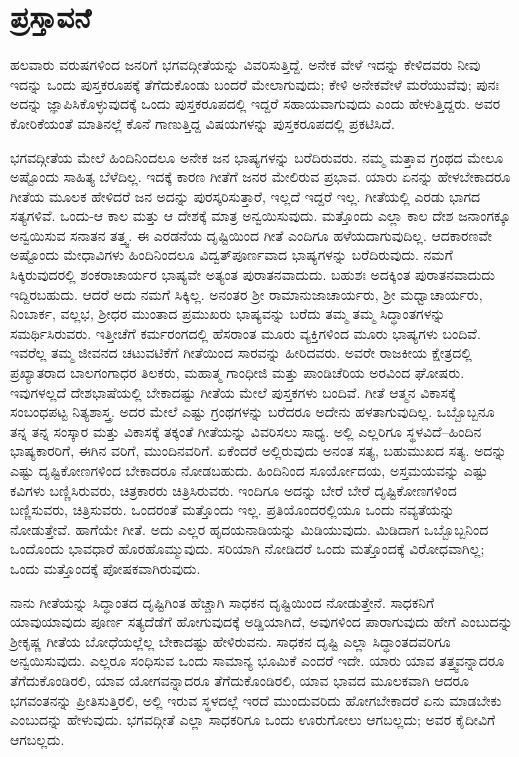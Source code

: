 
\chapter*{ಪ್ರಸ್ತಾವನೆ}

ಹಲವಾರು ವರುಷಗಳಿಂದ ಜನರಿಗೆ ಭಗವದ್ಗೀತೆಯನ್ನು ವಿವರಿಸುತ್ತಿದ್ದೆ. ಅನೇಕ ವೇಳೆ ಇದನ್ನು ಕೇಳಿದವರು ನೀವು ಇದನ್ನು ಒಂದು ಪುಸ್ತಕರೂಪಕ್ಕೆ ತೆಗೆದುಕೊಂಡು ಬಂದರೆ ಮೇಲಾಗುವುದು; ಕೇಳಿ ಅನೇಕವೇಳೆ ಮರೆಯುವೆವು; ಪುನಃ ಅದನ್ನು ಜ್ಞಾಪಿಸಿಕೊಳ್ಳುವುದಕ್ಕೆ ಒಂದು ಪುಸ್ತಕರೂಪದಲ್ಲಿ ಇದ್ದರೆ ಸಹಾಯವಾಗುವುದು ಎಂದು ಹೇಳುತ್ತಿದ್ದರು. ಅವರ ಕೋರಿಕೆಯಂತೆ ಮಾತಿನಲ್ಲೆ ಕೊನೆ ಗಾಣುತ್ತಿದ್ದ ವಿಷಯಗಳನ್ನು ಪುಸ್ತಕರೂಪದಲ್ಲಿ ಪ್ರಕಟಿಸಿದೆ.

ಭಗವದ್ಗೀತೆಯ ಮೇಲೆ ಹಿಂದಿನಿಂದಲೂ ಅನೇಕ ಜನ ಭಾಷ್ಯಗಳನ್ನು ಬರೆದಿರುವರು. ನಮ್ಮ ಮತ್ತಾವ ಗ್ರಂಥದ ಮೇಲೂ ಅಷ್ಟೊಂದು ಸಾಹಿತ್ಯ ಬೆಳೆದಿಲ್ಲ. ಇದಕ್ಕೆ ಕಾರಣ ಗೀತೆಗೆ ಜನರ ಮೇಲಿರುವ ಪ್ರಭಾವ. ಯಾರು ಏನನ್ನು ಹೇಳಬೇಕಾದರೂ ಗೀತೆಯ ಮೂಲಕ ಹೇಳಿದರೆ ಜನ ಅದನ್ನು ಪುರಸ್ಕರಿಸುತ್ತಾರೆ, ಇಲ್ಲದೆ ಇದ್ದರೆ ಇಲ್ಲ. ಗೀತೆಯಲ್ಲಿ ಎರಡು ಭಾಗದ ಸತ್ಯಗಳಿವೆ. ಒಂದು-ಆ ಕಾಲ ಮತ್ತು ಆ ದೇಶಕ್ಕೆ ಮಾತ್ರ ಅನ್ವಯಿಸುವುದು. ಮತ್ತೊಂದು ಎಲ್ಲಾ ಕಾಲ ದೇಶ ಜನಾಂಗಕ್ಕೂ ಅನ್ವಯಿಸುವ ಸನಾತನ ತತ್ತ್ವ. ಈ ಎರಡನೆಯ ದೃಷ್ಟಿಯಿಂದ ಗೀತೆ ಎಂದಿಗೂ ಹಳೆಯದಾಗುವುದಿಲ್ಲ. ಆದಕಾರಣವೇ ಅಷ್ಟೊಂದು ಮೇಧಾವಿಗಳು ಹಿಂದಿನಿಂದಲೂ ವಿದ್ವತ್​ಪೂರ್ಣವಾದ ಭಾಷ್ಯಗಳನ್ನು ಬರೆದಿರುವುದು. ನಮಗೆ ಸಿಕ್ಕಿರುವುದರಲ್ಲಿ ಶಂಕರಾಚಾರ್ಯರ ಭಾಷ್ಯವೇ ಅತ್ಯಂತ ಪುರಾತನವಾದುದು. ಬಹುಶಃ ಅದಕ್ಕಿಂತ ಪುರಾತನವಾದುದು ಇದ್ದಿರಬಹುದು. ಆದರೆ ಅದು ನಮಗೆ ಸಿಕ್ಕಿಲ್ಲ. ಅನಂತರ ಶ್ರೀ ರಾಮಾನುಜಾಚಾರ್ಯರು, ಶ್ರೀ ಮಧ್ವಾಚಾರ್ಯರು, ನಿಂಬಾರ್ಕ, ವಲ್ಲಭ, ಶ್ರೀಧರ ಮುಂತಾದ ಪ್ರಮುಖರು ಭಾಷ್ಯವನ್ನು ಬರೆದು ತಮ್ಮ ತಮ್ಮ ಸಿದ್ಧಾಂತಗಳನ್ನು ಸಮರ್ಥಿಸಿರುವರು. ಇತ್ತೀಚೆಗೆ ಕರ್ಮರಂಗದಲ್ಲಿ ಹೆಸರಾಂತ ಮೂರು ವ್ಯಕ್ತಿಗಳಿಂದ ಮೂರು ಭಾಷ್ಯಗಳು ಬಂದಿವೆ. ಇವರೆಲ್ಲ ತಮ್ಮ ಜೀವನದ ಚಟುವಟಿಕೆಗೆ ಗೀತೆಯಿಂದ ಸಾರವನ್ನು ಹೀರಿದವರು. ಅವರೇ ರಾಜಕೀಯ ಕ್ಷೇತ್ರದಲ್ಲಿ ಪ್ರಖ್ಯಾತರಾದ ಬಾಲಗಂಗಾಧರ ತಿಲಕರು, ಮಹಾತ್ಮ ಗಾಂಧೀಜಿ ಮತ್ತು ಪಾಂಡಿಚೆರಿಯ ಅರವಿಂದ ಘೋಷರು. ಇವುಗಳಲ್ಲದೆ ದೇಶಭಾಷೆಯಲ್ಲಿ ಬೇಕಾದಷ್ಟು ಗೀತೆಯ ಮೇಲೆ ಪುಸ್ತಕಗಳು ಬಂದಿವೆ. ಗೀತೆ ಆತ್ಮನ ವಿಕಾಸಕ್ಕೆ ಸಂಬಂಧಪಟ್ಟ ನಿತ್ಯಶಾಸ್ತ್ರ. ಅದರ ಮೇಲೆ ಎಷ್ಟು ಗ್ರಂಥಗಳನ್ನು ಬರೆದರೂ ಅದೇನು ಹಳತಾಗುವುದಿಲ್ಲ. ಒಬ್ಬೊಬ್ಬನೂ ತನ್ನ ತನ್ನ ಸಂಸ್ಕಾರ ಮತ್ತು ವಿಕಾಸಕ್ಕೆ ತಕ್ಕಂತೆ ಗೀತೆಯನ್ನು ವಿವರಿಸಲು ಸಾಧ್ಯ. ಅಲ್ಲಿ ಎಲ್ಲರಿಗೂ ಸ್ಥಳವಿದೆ–ಹಿಂದಿನ ಭಾಷ್ಯಕಾರರಿಗೆ, ಈಗಿನ ವರಿಗೆ, ಮುಂದಿನವರಿಗೆ. ಏಕೆಂದರೆ ಅಲ್ಲಿರುವುದು ಅನಂತ ಸತ್ಯ, ಬಹುಮುಖದ ಸತ್ಯ. ಅದನ್ನು ಎಷ್ಟು ದೃಷ್ಟಿಕೋಣಗಳಿಂದ ಬೇಕಾದರೂ ನೋಡಬಹುದು. ಹಿಂದಿನಿಂದ ಸೂರ್ಯೋದಯ, ಅಸ್ತಮಯವನ್ನು ಎಷ್ಟು ಕವಿಗಳು ಬಣ್ಣಿಸಿರುವರು, ಚಿತ್ರಕಾರರು ಚಿತ್ರಿಸಿರುವರು. ಇಂದಿಗೂ ಅದನ್ನು ಬೇರೆ ಬೇರೆ ದೃಷ್ಟಿಕೋಣಗಳಿಂದ ಬಣ್ಣಿಸುವರು, ಚಿತ್ರಿಸುವರು. ಒಂದರಂತೆ ಮತ್ತೊಂದು ಇಲ್ಲ. ಪ್ರತಿಯೊಂದರಲ್ಲಿಯೂ ಒಂದು ನವ್ಯತೆಯನ್ನು ನೋಡುತ್ತೇವೆ. ಹಾಗೆಯೇ ಗೀತೆ. ಅದು ಎಲ್ಲರ ಹೃದಯನಾಡಿಯನ್ನು ಮಿಡಿಯುವುದು. ಮಿಡಿದಾಗ ಒಬ್ಬೊಬ್ಬನಿಂದ ಒಂದೊಂದು ಭಾವಧಾರೆ ಹೊರಹೊಮ್ಮುವುದು. ಸರಿಯಾಗಿ ನೋಡಿದರೆ ಒಂದು ಮತ್ತೊಂದಕ್ಕೆ ವಿರೋಧವಾಗಿಲ್ಲ; ಒಂದು ಮತ್ತೊಂದಕ್ಕೆ ಪೋಷಕವಾಗಿರುವುದು.

ನಾನು ಗೀತೆಯನ್ನು ಸಿದ್ಧಾಂತದ ದೃಷ್ಟಿಗಿಂತ ಹೆಚ್ಚಾಗಿ ಸಾಧಕನ ದೃಷ್ಟಿಯಿಂದ ನೋಡುತ್ತೇನೆ. ಸಾಧಕನಿಗೆ ಯಾವುಯಾವುದು ಪೂರ್ಣ ಸತ್ಯದೆಡೆಗೆ ಹೋಗುವುದಕ್ಕೆ ಅಡ್ಡಿಯಾಗಿದೆ, ಅವುಗಳಿಂದ ಪಾರಾಗುವುದು ಹೇಗೆ ಎಂಬುದನ್ನು ಶ್ರೀಕೃಷ್ಣ ಗೀತೆಯ ಬೋಧೆಯಲ್ಲೆಲ್ಲ ಬೇಕಾದಷ್ಟು ಹೇಳಿರುವನು. ಸಾಧಕನ ದೃಷ್ಟಿ ಎಲ್ಲಾ ಸಿದ್ಧಾಂತದವರಿಗೂ ಅನ್ವಯಿಸುವುದು. ಎಲ್ಲರೂ ಸಂಧಿಸುವ ಒಂದು ಸಾಮಾನ್ಯ ಭೂಮಿಕೆ ಎಂದರೆ ಇದೇ. ಯಾರು ಯಾವ ತತ್ತ್ವವನ್ನಾದರೂ ತೆಗೆದುಕೊಂಡಿರಲಿ, ಯಾವ ಯೋಗವನ್ನಾದರೂ ತೆಗೆದುಕೊಂಡಿರಲಿ, ಯಾವ ಭಾವದ ಮೂಲಕವಾಗಿ ಆದರೂ ಭಗವಂತನನ್ನು ಪ್ರೀತಿಸುತ್ತಿರಲಿ, ಅಲ್ಲಿ ಇರುವ ಸ್ಥಳದಲ್ಲೆ ಇರದೆ ಮುಂದುವರಿದು ಹೋಗಬೇಕಾದರೆ ಏನು ಮಾಡಬೇಕು ಎಂಬುದನ್ನು ಹೇಳುವುದು. ಭಗವದ್ಗೀತೆ ಎಲ್ಲಾ ಸಾಧಕರಿಗೂ ಒಂದು ಊರುಗೋಲು ಆಗಬಲ್ಲದು; ಅವರ ಕೈದೀವಿಗೆ ಆಗಬಲ್ಲದು.

